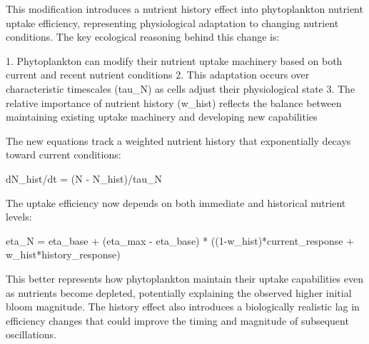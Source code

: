 This modification introduces a nutrient history effect into phytoplankton nutrient uptake efficiency, representing physiological adaptation to changing nutrient conditions. The key ecological reasoning behind this change is:

1. Phytoplankton can modify their nutrient uptake machinery based on both current and recent nutrient conditions
2. This adaptation occurs over characteristic timescales (tau_N) as cells adjust their physiological state
3. The relative importance of nutrient history (w_hist) reflects the balance between maintaining existing uptake machinery and developing new capabilities

The new equations track a weighted nutrient history that exponentially decays toward current conditions:

dN_hist/dt = (N - N_hist)/tau_N

The uptake efficiency now depends on both immediate and historical nutrient levels:

eta_N = eta_base + (eta_max - eta_base) * ((1-w_hist)*current_response + w_hist*history_response)

This better represents how phytoplankton maintain their uptake capabilities even as nutrients become depleted, potentially explaining the observed higher initial bloom magnitude. The history effect also introduces a biologically realistic lag in efficiency changes that could improve the timing and magnitude of subsequent oscillations.
